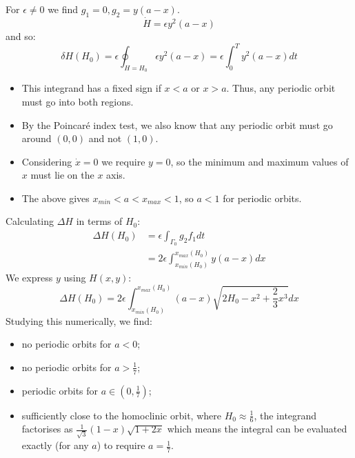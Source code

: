 \documentclass[../Main.tex]{subfiles}
\begin{document}
\begin{example}
    For $\epsilon \neq 0$ we find $g_1 = 0, g_2 = y(a-x)$.
    \begin{equation*}
        \dot{H} = \epsilon y^2 (a-x)
    \end{equation*}
    and so:
    \begin{equation*}
        \delta H(H_0) = \epsilon \oint_{H = H_0} \epsilon y^2(a-x) = \epsilon \int_0^T y^2(a-x) dt
    \end{equation*}
    \begin{itemize}
        \item This integrand has a fixed sign if $x < a$ or $x > a$. Thus, any periodic orbit must go into both regions.
        \item By the Poincaré index test, we also know that any periodic orbit must go around $(0, 0)$ and not $(1, 0)$.
        \item Considering $\dot{x} = 0$ we require $y = 0$, so the minimum and maximum values of $x$ must lie on the $x$ axis.
        \item The above gives $x_{min} < a < x_{max} < 1$, so $a < 1$ for periodic orbits.
    \end{itemize}
    Calculating $\Delta H$ in terms of $H_0$:
    \begin{align*}
        \Delta H (H_0) &= \epsilon \int_{\Gamma_0} g_2 f_1 dt \\
        &= 2\epsilon \int_{x_{min}(H_0)}^{x_{max}(H_0)} y (a-x) dx
    \end{align*}
    We express $y$ using $H(x, y)$:
    \begin{equation*}
        \Delta H(H_0) = 2\epsilon \int_{x_{min}(H_0)}^{x_{max}(H_0)} (a-x)\sqrt{2H_0 - x^2 + \frac23 x^3} dx
    \end{equation*}
    Studying this numerically, we find:
    \begin{itemize}
        \item no periodic orbits for $a < 0$;
        \item no periodic orbits for $a > \frac17$;
        \item periodic orbits for $a \in \left(0, \frac17\right)$;
        \item sufficiently close to the homoclinic orbit, where $H_0 \approx \frac16$, the integrand factorises as $\frac1{\sqrt{3}} (1-x) \sqrt{1+2x}$ which means the integral can be evaluated exactly (for any $a$) to require $a = \frac17$.
    \end{itemize}
\end{example}
\end{document}
